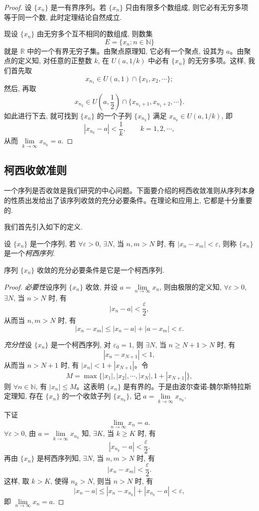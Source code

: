 \begin{proof}
设 $\{x_n\}$ 是一有界序列。若 $\{x_n\}$ 只由有限多个数组成, 则它必有无穷多项等于同一个数, 此时定理结论自然成立.

现设 $\{x_n\}$ 由无穷多个互不相同的数组成, 则数集
\[
  E=\{x_n:n\in\mathbb{N}\}
\]
就是 $\mathbb{R}$ 中的一个有界无穷子集。由聚点原理知, 它必有一个聚点, 设其为 $a$。由聚点的定义知, 对任意的正整数 $k$, 在 $U(a,1/k)$ 中必有 $\{x_n\}$ 的无穷多项。这样, 我们首先取
\[
  x_{n_1}\in U(a,1)\cap\{x_1,x_2,\cdots\};
\]
然后, 再取
\[
  x_{n_2}\in U\left(a,\frac12\right)\cap\{x_{n_1+1},x_{n_1+2},\cdots\}.
\]
如此进行下去, 就可找到 $\{x_n\}$ 的一个子列 $\{x_{n_k}\}$ 满足 $x_{n_k}\in U(a,1/k)$, 即
\[
  |x_{n_k}-a|<\frac1k,\qquad k=1,2,\cdots,
\]
从而 $\lim\limits_{k\to\infty}x_{n_k}=a$.
\end{proof}


\subsection{柯西收敛准则}
\label{subsec:ma-2-4-4}

一个序列是否收敛是我们研究的中心问题。下面要介绍的柯西收敛准则从序列本身的性质出发给出了该序列收敛的充分必要条件。在理论和应用上, 它都是十分重要的.

我们首先引入如下的定义.

\begin{definition}\label{definition:ma-2-4-2}
设 $\{x_n\}$ 是一个序列, 若 $\forall\varepsilon>0$, $\exists N$, 当 $n,m>N$ 时, 有 $|x_n-x_m|<\varepsilon$, 则称 $\{x_n\}$ 是一个\emph{柯西序列}.
\end{definition}


\begin{theorem}[{柯西收敛准则}]\label{theorem:ma-2-4-6}
序列 $\{x_n\}$ 收敛的充分必要条件是它是一个柯西序列.
\end{theorem}


\begin{proof}
\emph{必要性}\quad 设序列 $\{x_n\}$ 收敛, 并设 $a=\lim\limits_{n\to\infty}x_n$, 则由极限的定义知, $\forall\varepsilon>0$, $\exists N$, 当 $n>N$ 时, 有
\[
  |x_n-a|<\frac\varepsilon2,
\]
从而当 $n,m>N$ 时, 有
\[
  |x_n-x_m|\leqslant |x_n-a|+|a-x_m|<\varepsilon.
\]

\emph{充分性}\quad 设 $\{x_n\}$ 是一个柯西序列, 对 $\varepsilon_0=1$, 则 $\exists N$, 当 $n\geqslant N+1>N$ 时, 有
\[
  |x_n-x_{N+1}|<1,
\]
从而当 $n>N+1$ 时, 有 $|x_n|<1+|x_{N+1}|$。令
\[
  M=\max\{|x_1|,|x_2|,\cdots,|x_N|,1+|x_{N+1}|\},
\]
则 $\forall n\in\mathbb{N}$, 有 $|x_n|\leqslant M$。这表明 $\{x_n\}$ 是有界的。于是由波尔查诺-魏尔斯特拉斯定理知, 存在 $\{x_n\}$ 的一个收敛子列 $\{x_{n_k}\}$, 记 $a=\lim\limits_{k\to\infty}x_{n_k}$.

下证
\[
  \lim_{n\to\infty}x_n=a.
\]
$\forall\varepsilon>0$, 由 $a=\lim\limits_{k\to\infty}x_{n_k}$ 知, $\exists K$, 当 $k\geqslant K$ 时, 有
\[
  |x_{n_k}-a|<\frac\varepsilon2.
\]
再由 $\{x_n\}$ 是柯西序列知, $\exists N$, 当 $n,m>N$ 时, 有
\[
  |x_n-x_m|<\frac\varepsilon2.
\]
这样, 取 $k>K$, 使得 $n_k>N$, 则当 $n>N$ 时, 有
\[
  |x_n-a|\leqslant |x_n-x_{n_k}|+|x_{n_k}-a|<\varepsilon,
\]
即 $\lim\limits_{n\to\infty}x_n=a$.
\end{proof}


